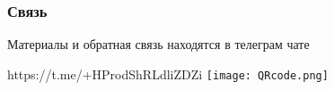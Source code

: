 
\begin{frame}
	\frametitle{Связь}
    \center Материалы и обратная связь находятся в телеграм чате

    \center https://t.me/+HProdShRLdliZDZi
    \center\texttt{[image: QRcode.png]}
\end{frame}



